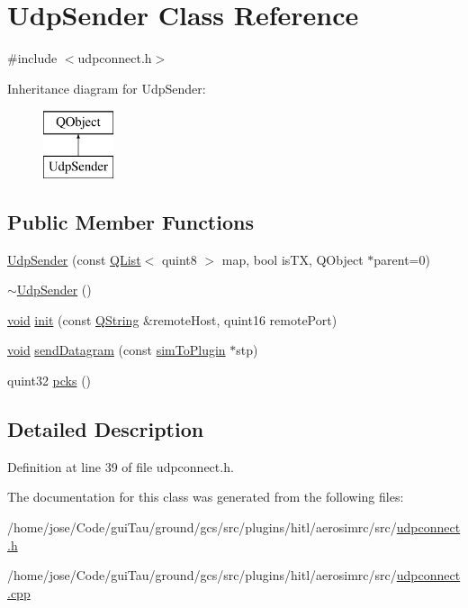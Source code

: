 \hypertarget{class_udp_sender}{\section{Udp\-Sender Class Reference}
\label{class_udp_sender}
}


{\ttfamily \#include $<$udpconnect.\-h$>$}

Inheritance diagram for Udp\-Sender\-:\begin{figure}[H]
\begin{center}
\leavevmode
\includegraphics[height=2.000000cm]{class_udp_sender}
\end{center}
\end{figure}
\subsection*{Public Member Functions}
\begin{DoxyCompactItemize}
\item 
\hyperlink{group___aero_sim_r_c_ga33d974a790381e7266d6d4c57ca40f1f}{Udp\-Sender} (const \hyperlink{class_q_list}{Q\-List}$<$ quint8 $>$ map, bool is\-T\-X, Q\-Object $\ast$parent=0)
\item 
\hyperlink{group___aero_sim_r_c_gaa3cfe219b7bfa771b77b85dacc5d5e50}{$\sim$\-Udp\-Sender} ()
\item 
\hyperlink{group___u_a_v_objects_plugin_ga444cf2ff3f0ecbe028adce838d373f5c}{void} \hyperlink{group___aero_sim_r_c_ga14593f9c2d83a4feb7c05639f521cd58}{init} (const \hyperlink{group___u_a_v_objects_plugin_gab9d252f49c333c94a72f97ce3105a32d}{Q\-String} \&remote\-Host, quint16 remote\-Port)
\item 
\hyperlink{group___u_a_v_objects_plugin_ga444cf2ff3f0ecbe028adce838d373f5c}{void} \hyperlink{group___aero_sim_r_c_ga1c5e2d6839935b0860fc2bb6912ec125}{send\-Datagram} (const \hyperlink{structsim_to_plugin}{sim\-To\-Plugin} $\ast$stp)
\item 
quint32 \hyperlink{group___aero_sim_r_c_gaa06c6b62e9498dee34b35c225479a52a}{pcks} ()
\end{DoxyCompactItemize}


\subsection{Detailed Description}


Definition at line 39 of file udpconnect.\-h.



The documentation for this class was generated from the following files\-:\begin{DoxyCompactItemize}
\item 
/home/jose/\-Code/gui\-Tau/ground/gcs/src/plugins/hitl/aerosimrc/src/\hyperlink{udpconnect_8h}{udpconnect.\-h}\item 
/home/jose/\-Code/gui\-Tau/ground/gcs/src/plugins/hitl/aerosimrc/src/\hyperlink{udpconnect_8cpp}{udpconnect.\-cpp}\end{DoxyCompactItemize}
